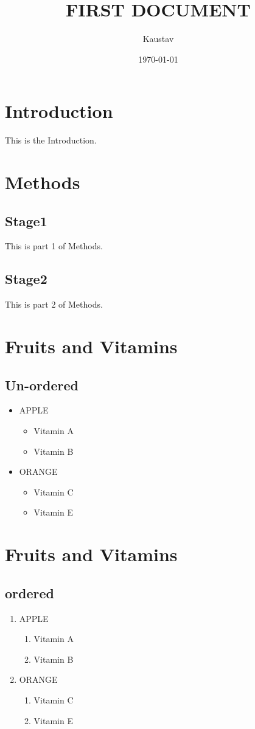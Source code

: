 \documentclass[a4 paper,12pt]{article}
\begin{document}
	\title{FIRST DOCUMENT}
	\author{Kaustav}
	\date{\today}
	\maketitle
	\tableofcontents
	\newpage
	\section{Introduction}
	This is the Introduction.
	\newpage
	\section{Methods}
		\subsection{Stage1}
		This is part 1 of Methods.
		\subsection{Stage2}
		This is part 2 of Methods.
		
	\section{Fruits and Vitamins}
		\subsection{Un-ordered}
		\begin{itemize}
			\item APPLE
			\begin{itemize}
				\item {Vitamin A}
				\item {Vitamin B}
			\end{itemize}
			\item ORANGE
			\begin{itemize}
				\item {Vitamin C}
				\item {Vitamin E}
			\end{itemize}
		\end{itemize}

		\section{Fruits and Vitamins}
		\subsection{ordered}
			\begin{enumerate}
				\item APPLE
				\begin{enumerate}
					\item {Vitamin A}
					\item {Vitamin B}
				\end{enumerate}
					\item ORANGE
				\begin{enumerate}
					\item {Vitamin C}
					\item {Vitamin E}
				\end{enumerate}
			\end{enumerate}
\end{document}
